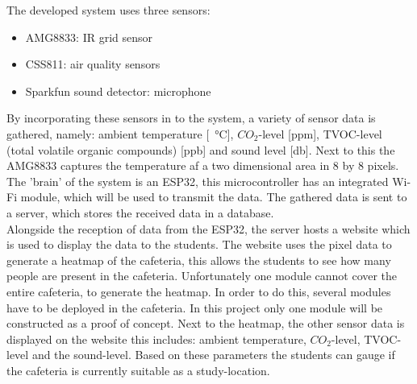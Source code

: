 \documentclass[11pt,a4paper]{article}
\begin{document}
The developed system uses three sensors: 
\begin{itemize}
	\item AMG8833: IR grid sensor
	\item CSS811: air quality sensors
	\item Sparkfun sound detector: microphone
\end{itemize}
By incorporating these sensors in to the system, a variety of sensor data is gathered, namely: ambient temperature [\SI{}{\celsius}], $CO_2$-level [ppm], TVOC-level (total volatile organic compounds) [ppb] and sound level [db]. Next to this the AMG8833 captures the temperature af a two dimensional area in 8 by 8 pixels. \\

The 'brain' of the system is an ESP32, this microcontroller has an integrated Wi-Fi module, which will be used to transmit the data. The gathered data is sent to a server, which stores the received data in a database. \\

Alongside the reception of data from the ESP32, the server hosts a website which is used to display the data to the students. The website uses the pixel data to generate a heatmap of the cafeteria, this allows the students to see how many people are present in the cafeteria. Unfortunately one module cannot cover the entire cafeteria, to generate the heatmap. In order to do this, several modules have to be deployed in the cafeteria. In this project only one module will be constructed as a proof of concept. Next to the heatmap, the other sensor data is displayed on the website this includes: ambient temperature, $CO_2$-level, TVOC-level and the sound-level. Based on these parameters the students can gauge if the cafeteria is currently suitable as a study-location.
\end{document}
